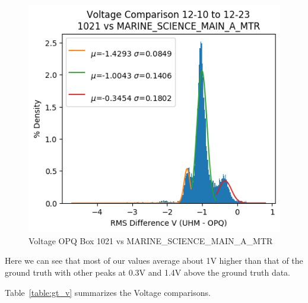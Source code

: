 \begin{figure}[H]
    \centering
    \includegraphics[width=0.75\linewidth]{figures/v_hist_1021_MARINE_SCIENCE_MAIN_A_MTR.png}
    \caption{Voltage OPQ Box 1021 vs MARINE\_SCIENCE\_MAIN\_A\_MTR}
    \label{fig:v_hist_iii}
\end{figure}

Here we can see that most of our values average about 1V higher than that of the ground truth with other peaks at 0.3V and 1.4V above the ground truth data.

Table~\ref{table:gt_v} summarizes the Voltage comparisons.


